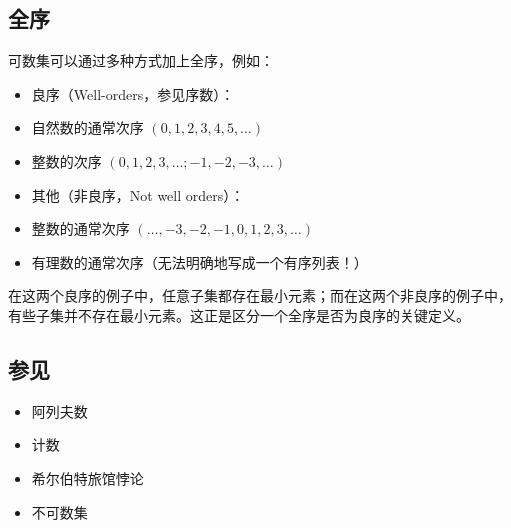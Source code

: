 \subsection{全序}
可数集可以通过多种方式加上全序，例如：
\begin{itemize}
\item 良序（Well-orders，参见序数）：
\item 自然数的通常次序 $(0, 1, 2, 3, 4, 5, \dots)$
\item 整数的次序 $(0, 1, 2, 3, \dots; -1, -2, -3, \dots)$
\item 其他（非良序，Not well orders）：
\item 整数的通常次序 $(\dots, -3, -2, -1, 0, 1, 2, 3, \dots)$
\item 有理数的通常次序（无法明确地写成一个有序列表！）
\end{itemize}
在这两个良序的例子中，任意子集都存在最小元素；而在这两个非良序的例子中，有些子集并不存在最小元素。这正是区分一个全序是否为良序的关键定义。
\subsection{参见}
\begin{itemize}
\item 阿列夫数
\item 计数
\item 希尔伯特旅馆悖论
\item 不可数集
\end{itemize}
